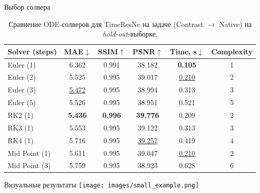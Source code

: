 \documentclass[11pt]{beamer}
\begin{document}
\begin{frame}{Выбор солвера}
    \begin{table}[h!]
\centering
\label{tab:solver_hold}
\renewcommand{\arraystretch}{1.15}
\begin{tabular}{lccccc}
\toprule
\textbf{Solver (steps)} & MAE$\downarrow$ & SSIM$\uparrow$ & PSNR$\uparrow$ & Time, s$\downarrow$ & Complexity \\
\midrule
Euler (1)      & 6.362 & 0.991 & 38.182 & \textbf{0.105} & 1 \\
Euler (2)      & 5.525 & 0.995 & 39.017 & \underline{0.210} & 2 \\
Euler (3)      & \underline{5.472} & 0.995 & 38.994 & 0.313 & 3 \\
Euler (5)      & 5.526 & 0.995 & 38.951 & 0.521 & 5 \\
RK2 (1)        & \textbf{5.436} & \textbf{0.996} & \textbf{39.776} & 0.209 & 2 \\
RK3 (1)        & 5.553 & 0.995 & 39.122 & 0.313 & 3 \\
RK4 (1)        & 5.716 & 0.995 & \underline{39.257} & 0.419 & 4 \\
Mid Point (1)  & 5.611 & 0.995 & 39.047 & \underline{0.210} & 2 \\
Mid Point (3)  & 5.759 & 0.995 & 38.923 & 0.628 & 6 \\
\bottomrule
\end{tabular}
\caption{Сравнение ODE-солверов для  TimeResNe на задаче (Contrast $\to$ Native) на \emph{hold-out}-выборке.}
\end{table}

\end{frame}

\begin{frame}{Визуальные результаты}
\centering
\texttt{[image: images/small\_example.png]}
\end{frame}
\end{document}
